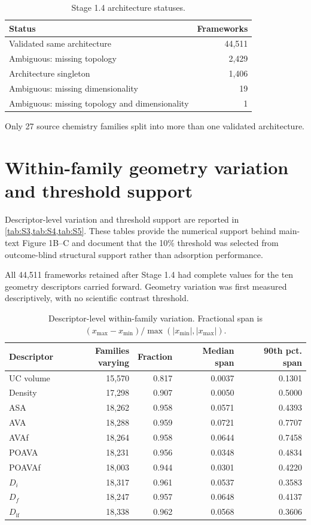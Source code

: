 \documentclass[11pt,a4paper]{article}
\begin{document}
\begin{table}[H]
\centering
\caption{Stage 1.4 architecture statuses.}
\label{tab:S2}
\begin{tabularx}{0.82\textwidth}{Xr}
\toprule
Status & Frameworks \\
\midrule
Validated same architecture & 44,511 \\
Ambiguous: missing topology & 2,429 \\
Architecture singleton & 1,406 \\
Ambiguous: missing dimensionality & 19 \\
Ambiguous: missing topology and dimensionality & 1 \\
\bottomrule
\end{tabularx}
\end{table}

Only 27 source chemistry families split into more than one validated architecture.

\section{Within-family geometry variation and threshold support}
\label{sec:geometry-support}

Descriptor-level variation and threshold support are reported in \cref{tab:S3,tab:S4,tab:S5}. These tables provide the numerical support behind main-text Figure 1B--C and document that the 10\% threshold was selected from outcome-blind structural support rather than adsorption performance.


All 44,511 frameworks retained after Stage 1.4 had complete values for the ten
geometry descriptors carried forward. Geometry variation was first measured
descriptively, with no scientific contrast threshold.

\begin{table}[H]
\centering
\caption{Descriptor-level within-family variation. Fractional span is
$(x_{\max}-x_{\min})/\max(|x_{\min}|,|x_{\max}|)$.}
\label{tab:S3}
\begin{tabular}{lrrrr}
\toprule
Descriptor & Families varying & Fraction & Median span & 90th pct. span \\
\midrule
UC volume & 15,570 & 0.817 & 0.0037 & 0.1301 \\
Density & 17,298 & 0.907 & 0.0050 & 0.5000 \\
ASA & 18,262 & 0.958 & 0.0571 & 0.4393 \\
AVA & 18,288 & 0.959 & 0.0721 & 0.7707 \\
AVAf & 18,264 & 0.958 & 0.0644 & 0.7458 \\
POAVA & 18,231 & 0.956 & 0.0348 & 0.4834 \\
POAVAf & 18,003 & 0.944 & 0.0301 & 0.4220 \\
$D_i$ & 18,317 & 0.961 & 0.0537 & 0.3583 \\
$D_f$ & 18,247 & 0.957 & 0.0648 & 0.4137 \\
$D_{\mathrm{if}}$ & 18,338 & 0.962 & 0.0568 & 0.3606 \\
\bottomrule
\end{tabular}
\end{table}
\end{document}
